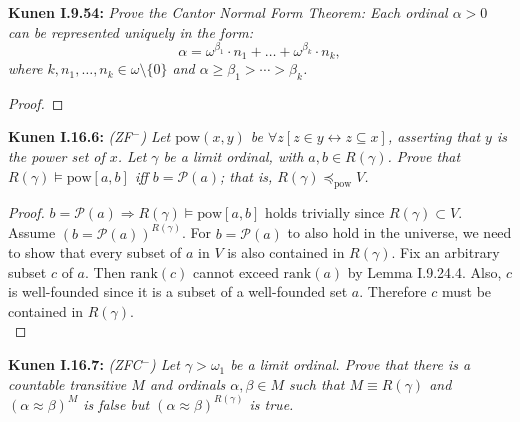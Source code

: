 \documentclass{article}
\begin{document}
\textbf{Kunen I.9.54:} \it Prove the Cantor Normal Form Theorem: Each
  ordinal $\alpha>0$ can be represented uniquely in the form:
  \[\alpha =\omega^{\beta_1}\cdot n_1 +\ldots +\omega^{\beta_k}\cdot n_k,\]
  where $k,n_1,\ldots,n_k\in\omega\setminus\{0\}$ and
  $\alpha\geq\beta_1>\cdots>\beta_k$.

  \begin{proof}
  \end{proof}

\textbf{Kunen I.16.6:} \it (ZF$^-$) Let $\text{pow}(x,y)$ be $\forall z
  [z\in y \leftrightarrow z\subseteq x]$, asserting that $y$ is the power
  set of $x$. Let $\gamma$ be a limit ordinal, with $a,b\in R(\gamma)$.
  Prove that $R(\gamma) \models\text{pow}[a,b]$ iff $b=\mathcal{P}(a)$;
  that is, $R(\gamma) \preceq_{\text{pow}} V$.

  \begin{proof}
    $b=\mathcal{P}(a) \Rightarrow R(\gamma) \models\text{pow}[a,b]$ holds
    trivially since $R(\gamma)\subset V$. Assume
    $(b=\mathcal{P}(a))^{R(\gamma)}$. For $b=\mathcal{P}(a)$ to also hold
    in the universe, we need to show that every subset of $a$ in $V$ is
    also contained in $R(\gamma)$. Fix an arbitrary subset $c$ of $a$. Then
    $\text{rank}(c)$ cannot exceed $\text{rank}(a)$ by Lemma I.9.24.4.
    Also, $c$ is well-founded since it is a subset of a well-founded set
    $a$. Therefore $c$ must be contained in $R(\gamma)$. \\
  \end{proof}

\textbf{Kunen I.16.7:} \it (ZFC$^-$) Let $\gamma>\omega_1$ be a limit
  ordinal. Prove that there is a countable transitive $M$ and ordinals
  $\alpha,\beta\in M$ such that $M\equiv R(\gamma)$ and
  $(\alpha\approx\beta)^M$ is false but $(\alpha\approx\beta)^{R(\gamma)}$
  is true.
\end{document}

